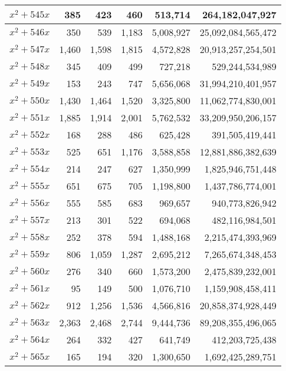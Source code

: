 \documentclass[a4paper]{amsproc}
\theoremstyle{plain}
\begin{document}
\begin{longtable}{ | l | r | r | r | r | r | }
$x^2 + 545x$ & 385 & 423 & 460 & 513{,}714 & 264{,}182{,}047{,}927 \\ \hline
$x^2 + 546x$ & 350 & 539 & 1{,}183 & 5{,}008{,}927 & 25{,}092{,}084{,}565{,}472 \\ \hline
$x^2 + 547x$ & 1{,}460 & 1{,}598 & 1{,}815 & 4{,}572{,}828 & 20{,}913{,}257{,}254{,}501 \\ \hline
$x^2 + 548x$ & 345 & 409 & 499 & 727{,}218 & 529{,}244{,}534{,}989 \\ \hline
$x^2 + 549x$ & 153 & 243 & 747 & 5{,}656{,}068 & 31{,}994{,}210{,}401{,}957 \\ \hline
$x^2 + 550x$ & 1{,}430 & 1{,}464 & 1{,}520 & 3{,}325{,}800 & 11{,}062{,}774{,}830{,}001 \\ \hline
$x^2 + 551x$ & 1{,}885 & 1{,}914 & 2{,}001 & 5{,}762{,}532 & 33{,}209{,}950{,}206{,}157 \\ \hline
$x^2 + 552x$ & 168 & 288 & 486 & 625{,}428 & 391{,}505{,}419{,}441 \\ \hline
$x^2 + 553x$ & 525 & 651 & 1{,}176 & 3{,}588{,}858 & 12{,}881{,}886{,}382{,}639 \\ \hline
$x^2 + 554x$ & 214 & 247 & 627 & 1{,}350{,}999 & 1{,}825{,}946{,}751{,}448 \\ \hline
$x^2 + 555x$ & 651 & 675 & 705 & 1{,}198{,}800 & 1{,}437{,}786{,}774{,}001 \\ \hline
$x^2 + 556x$ & 555 & 585 & 683 & 969{,}657 & 940{,}773{,}826{,}942 \\ \hline
$x^2 + 557x$ & 213 & 301 & 522 & 694{,}068 & 482{,}116{,}984{,}501 \\ \hline
$x^2 + 558x$ & 252 & 378 & 594 & 1{,}488{,}168 & 2{,}215{,}474{,}393{,}969 \\ \hline
$x^2 + 559x$ & 806 & 1{,}059 & 1{,}287 & 2{,}695{,}212 & 7{,}265{,}674{,}348{,}453 \\ \hline
$x^2 + 560x$ & 276 & 340 & 660 & 1{,}573{,}200 & 2{,}475{,}839{,}232{,}001 \\ \hline
$x^2 + 561x$ & 95 & 149 & 500 & 1{,}076{,}710 & 1{,}159{,}908{,}458{,}411 \\ \hline
$x^2 + 562x$ & 912 & 1{,}256 & 1{,}536 & 4{,}566{,}816 & 20{,}858{,}374{,}928{,}449 \\ \hline
$x^2 + 563x$ & 2{,}363 & 2{,}468 & 2{,}744 & 9{,}444{,}736 & 89{,}208{,}355{,}496{,}065 \\ \hline
$x^2 + 564x$ & 264 & 332 & 427 & 641{,}749 & 412{,}203{,}725{,}438 \\ \hline
$x^2 + 565x$ & 165 & 194 & 320 & 1{,}300{,}650 & 1{,}692{,}425{,}289{,}751 \\ \hline

\end{longtable}
\end{document}
